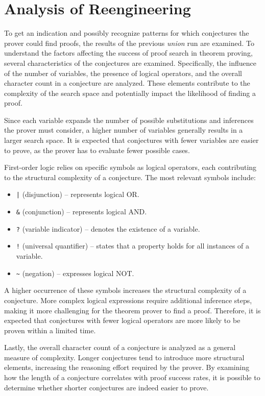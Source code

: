 \documentclass[english,version-2020-11]{uzl-thesis}
\begin{document}
\section{Analysis of Reengineering}

To get an indication and possibly recognize patterns for which conjectures the prover could find proofs, the results of the previous \textit{union} run are examined. To understand the factors affecting the success of proof search in theorem proving, several characteristics of the conjectures are examined. Specifically, the influence of the number of variables, the presence of logical operators, and the overall character count in a conjecture are analyzed. These elements contribute to the complexity of the search space and potentially impact the likelihood of finding a proof.

Since each variable expands the number of possible substitutions and inferences the prover must consider, a higher number of variables generally results in a larger search space. It is expected that conjectures with fewer variables are easier to prove, as the prover has to evaluate fewer possible cases.

First-order logic relies on specific symbols as logical operators, each contributing to the structural complexity of a conjecture. The most relevant symbols include:
\begin{itemize}
    \item \texttt{|} (disjunction) – represents logical OR.
    \item \texttt{\&} (conjunction) – represents logical AND.
    \item \texttt{?} (variable indicator) – denotes the existence of a variable.
    \item \texttt{!} (universal quantifier) – states that a property holds for all instances of a variable.
    \item \texttt{\~{}} (negation) – expresses logical NOT.
\end{itemize}
A higher occurrence of these symbols increases the structural complexity of a conjecture. More complex logical expressions require additional inference steps, making it more challenging for the theorem prover to find a proof. Therefore, it is expected that conjectures with fewer logical operators are more likely to be proven within a limited time.

Lastly, the overall character count of a conjecture is analyzed as a general measure of complexity. Longer conjectures tend to introduce more structural elements, increasing the reasoning effort required by the prover. By examining how the length of a conjecture correlates with proof success rates, it is possible to determine whether shorter conjectures are indeed easier to prove.
\end{document}

